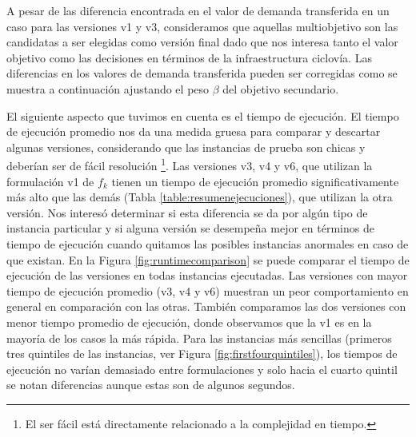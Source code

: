 A pesar de las diferencia encontrada en el valor de demanda transferida en un caso para las versiones v1 y v3, consideramos que aquellas multiobjetivo son las candidatas a ser elegidas como versión final dado que nos interesa tanto el valor objetivo como las decisiones en términos de la infraestructura ciclovía. Las diferencias en los valores de demanda transferida pueden ser corregidas como se muestra a continuación ajustando el peso $\beta$ del objetivo secundario.

El siguiente aspecto que tuvimos en cuenta es el tiempo de ejecución. El tiempo de ejecución promedio nos da una medida gruesa para comparar y descartar algunas versiones, considerando que las instancias de prueba son chicas y deberían ser de fácil resolución \footnote{El ser fácil está directamente relacionado a la complejidad en tiempo.}. Las versiones v3, v4 y v6, que utilizan la formulación v1 de $f_k$ tienen un tiempo de ejecución promedio significativamente más alto que las demás (Tabla \ref{table:resumenejecuciones}), que utilizan la otra versión. Nos interesó determinar si esta diferencia se da por algún tipo de instancia particular y si alguna versión se desempeña mejor en términos de tiempo de ejecución cuando quitamos las posibles instancias anormales en caso de que existan. En la Figura \ref{fig:runtimecomparison} se puede comparar el tiempo de ejecución de las versiones en todas instancias ejecutadas. Las versiones con mayor tiempo de ejecución promedio (v3, v4 y v6) muestran un peor comportamiento en general en comparación con las otras. También comparamos las dos versiones con menor tiempo promedio de ejecución, donde observamos que la v1 es en la mayoría de los casos la más rápida. Para las instancias más sencillas (primeros tres quintiles de las instancias, ver Figura \ref{fig:firstfourquintiles}), los tiempos de ejecución no varían demasiado entre formulaciones y solo hacia el cuarto quintil se notan diferencias aunque estas son de algunos segundos.

